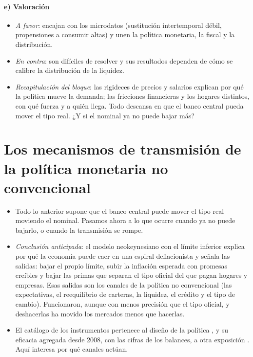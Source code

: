 \documentclass[11pt]{article}
\begin{document}
\paragraph{e) Valoración}
\begin{itemize}
\item \emph{A favor}: encajan con los microdatos (sustitución intertemporal débil, propensiones a consumir altas) y unen la política monetaria, la fiscal y la distribución.
\item \emph{En contra}: son difíciles de resolver y sus resultados dependen de cómo se calibre la distribución de la liquidez.
\item \emph{Recapitulación del bloque}: las rigideces de precios y salarios explican por qué la política mueve la demanda; las fricciones financieras y los hogares distintos, con qué fuerza y a quién llega. Todo descansa en que el banco central pueda mover el tipo real. ¿Y si el nominal ya no puede bajar más?
\end{itemize}

\section{Los mecanismos de transmisión\cortetitulo{} de la política monetaria no convencional}\label{sec:no-convencional}

\begin{itemize}
\item Todo lo anterior supone que el banco central puede mover el tipo real moviendo el nominal. Pasamos ahora a lo que ocurre cuando ya no puede bajarlo, o cuando la transmisión se rompe.
\item \emph{Conclusión anticipada}: el modelo neokeynesiano con el límite inferior explica por qué la economía puede caer en una espiral deflacionista y señala las salidas: bajar el propio límite, subir la inflación esperada con promesas creíbles y bajar las primas que separan el tipo oficial del que pagan hogares y empresas. Esas salidas son los canales de la política no convencional (las expectativas, el reequilibrio de carteras, la liquidez, el crédito y el tipo de cambio). Funcionaron, aunque con menos precisión que el tipo oficial, y deshacerlas ha movido los mercados menos que hacerlas.
\item El catálogo de los instrumentos pertenece al diseño de la política , y su eficacia agregada desde 2008, con las cifras de los balances, a otra exposición . Aquí interesa por qué canales actúan.
\end{itemize}
\end{document}
